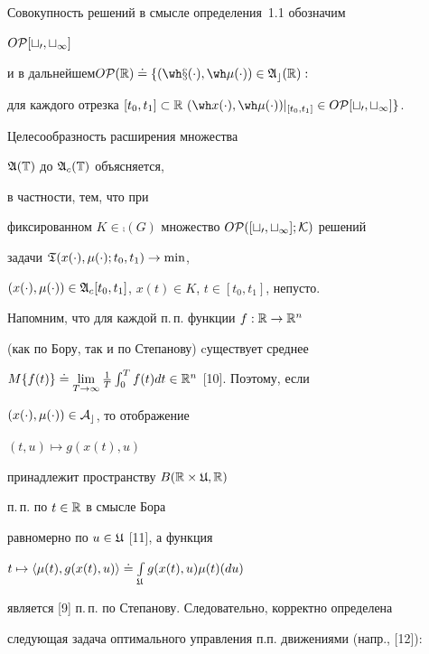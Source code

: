 Совокупность решений в смысле определения~1.1 обозначим


$O\cal P[t_0,t_1]$


и в дальнейшем\quad $ O\cal P(\bR)\doteq\{(\wh


x(\cdot),\wh \mu(\cdot))\in\frak A_c(\bR):$


для каждого отрезка $[t_0,t_1]\subset \bR \ 


(\wh x(\cdot),\wh \mu(\cdot))|_{[t_0,t_1]}\in O\cal P[t_0,t_1]\}$.





\begin{notes}


Целесообразность расширения множества


$\frak A(\Bbb T)$ до $\frak A_c(\Bbb T)$ объясняется,


в частности, тем, что при


фиксированном $K\in\comp(G)$ множество $O\cal P([t_0,t_1];K)$ решений


задачи $\frak T(x(\cdot),\mu(\cdot);t_0,t_1)\to\min$,


$(x(\cdot),\mu(\cdot))


\in\frak A_c[t_0,t_1]$, $x(t)\in K$, $t\in[t_0,t_1]$, непусто.


\end{notes}





Напомним, что для каждой п.\,п. функции $f:\Bbb R\to\Bbb R^n$


(как по Бору, так и по Степанову) cуществует среднее


$M\{f(t)\}\doteq\lim\limits_{T\to\infty }\frac{1}{T}


\int_0^T f(t)dt\in\bR^n$ [10]. Поэтому, если


$(x(\cdot),\mu(\cdot))\in\cal A_c$, то отображение


$(t,u)\mapsto g(x(t),u)$


принадлежит пространству $B(\Bbb R\times\frak U,\Bbb R)$


п.\,п. по $t\in\Bbb R$ в смысле Бора


равномерно по $u\in\frak U$ [11], а функция


$t\mapsto\langle\mu(t),g(x(t),u)\rangle


\doteq\int\limits_{\frak U}g(x(t),u)\mu(t)(du)$


является [9] п.\,п. по Степанову. Следовательно, корректно определена 


следующая задача оптимального управления п.п. движениями (напр., [12]):


